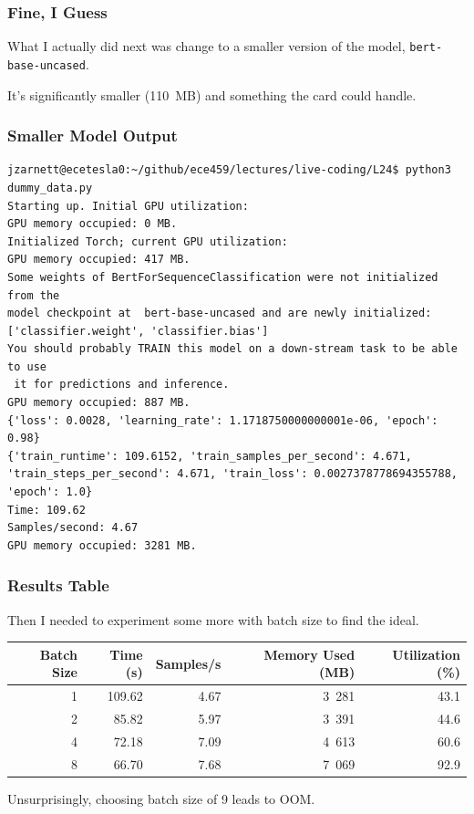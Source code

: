 \begin{frame}
\frametitle{Fine, I Guess}

What I actually did next was change to a smaller version of the model, \texttt{bert-base-uncased}.

It's significantly smaller (110~MB) and something the card could handle. 

\end{frame}

\begin{frame}[fragile]
\frametitle{Smaller Model Output}

{\scriptsize
\begin{verbatim}
jzarnett@ecetesla0:~/github/ece459/lectures/live-coding/L24$ python3 dummy_data.py 
Starting up. Initial GPU utilization:
GPU memory occupied: 0 MB.
Initialized Torch; current GPU utilization:
GPU memory occupied: 417 MB.
Some weights of BertForSequenceClassification were not initialized from the 
model checkpoint at  bert-base-uncased and are newly initialized: 
['classifier.weight', 'classifier.bias']
You should probably TRAIN this model on a down-stream task to be able to use
 it for predictions and inference.
GPU memory occupied: 887 MB.
{'loss': 0.0028, 'learning_rate': 1.1718750000000001e-06, 'epoch': 0.98}
{'train_runtime': 109.6152, 'train_samples_per_second': 4.671, 
'train_steps_per_second': 4.671, 'train_loss': 0.0027378778694355788, 'epoch': 1.0}
Time: 109.62
Samples/second: 4.67
GPU memory occupied: 3281 MB.
\end{verbatim}
}

\end{frame}

\begin{frame}
\frametitle{Results Table}

Then I needed to experiment some more with batch size to find the ideal.

\begin{center}
\begin{tabular}{r|r|r|r|r}
\textbf{Batch Size} & \textbf{Time (s)} & \textbf{Samples/s} & \textbf{Memory Used (MB)} & \textbf{Utilization (\%)} \\ \hline
1 & 109.62 & 4.67 & 3~281 & 43.1 \\
2 & 85.82 & 5.97 & 3~391 & 44.6 \\
4 & 72.18 & 7.09 & 4~613 & 60.6 \\
8 & 66.70 & 7.68 & 7~069 & 92.9 \\
\end{tabular}
\end{center}

Unsurprisingly, choosing batch size of 9 leads to OOM.

\end{frame}


